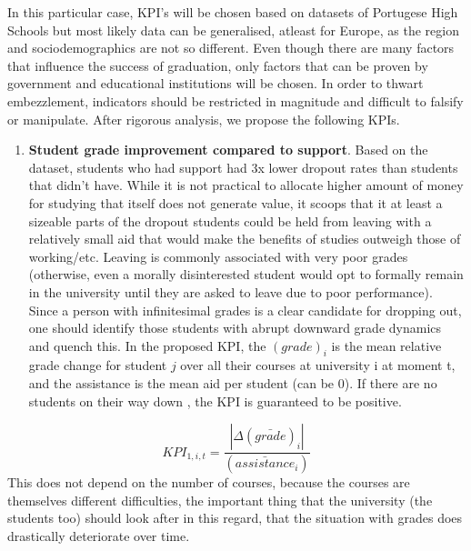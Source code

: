 \documentclass[
  letterpaper,
  DIV=11,
  numbers=noendperiod]{scrartcl}
\providecommand{\tightlist}{%
  \setlength{\itemsep}{0pt}\setlength{\parskip}{0pt}}\usepackage{longtable,booktabs,array}
\begin{document}
In this particular case, KPI's will be chosen based on datasets of
Portugese High Schools but most likely data can be generalised, atleast
for Europe, as the region and sociodemographics are not so different.
Even though there are many factors that influence the success of
graduation, only factors that can be proven by government and
educational institutions will be chosen. In order to thwart
embezzlement, indicators should be restricted in magnitude and difficult
to falsify or manipulate. After rigorous analysis, we propose the
following KPIs.

\begin{enumerate}
\def\labelenumi{\alph{enumi}.}
\tightlist
\item
  \textbf{Student grade improvement compared to support}. Based on the
  dataset, students who had support had 3x lower dropout rates than
  students that didn't have. While it is not practical to allocate
  higher amount of money for studying that itself does not generate
  value, it scoops that it at least a sizeable parts of the dropout
  students could be held from leaving with a relatively small aid that
  would make the benefits of studies outweigh those of working/etc.
  Leaving is commonly associated with very poor grades (otherwise, even
  a morally disinterested student would opt to formally remain in the
  university until they are asked to leave due to poor performance).
  Since a person with infinitesimal grades is a clear candidate for
  dropping out, one should identify those students with abrupt downward
  grade dynamics and quench this. In the proposed KPI, the
  \((grade)_{i}\) is the mean relative grade change for student \(j\)
  over all their courses at university i at moment t, and the assistance
  is the mean aid per student (can be 0). If there are no students on
  their way down , the KPI is guaranteed to be positive.
\end{enumerate}

\[KPI_{1, i,t} =  \frac{|\Delta(\bar{grade})_i|}{ (\bar{assistance}_i)}\]
This does not depend on the number of courses, because the courses are
themselves different difficulties, the important thing that the
university (the students too) should look after in this regard, that the
situation with grades does drastically deteriorate over time.
\end{document}
